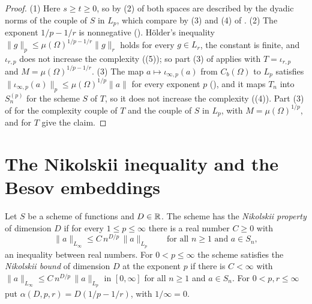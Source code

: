\begin{proof}
\leanok
{}
(1) Here $s \geq t \geq 0$, so by (2) of  both spaces are described by
the dyadic norms of the couple of $S$ in $L_p$, which compare by (3) and (4) of
. (2) The exponent $1/p - 1/r$ is nonnegative
(). H\"older's inequality
$\|g\|_p \leq \mu(\Omega)^{1/p - 1/r} \|g\|_r$ holds for every $g \in L_r$, the constant is
finite, and $\iota_{r,p}$ does not increase the complexity ((5)); so
part (3) of  applies with $T = \iota_{r,p}$ and
$M = \mu(\Omega)^{1/p - 1/r}$. (3) The map $a \mapsto \iota_{\infty,p}(a)$ from $C_b(\Omega)$ to
$L_p$ satisfies $\|\iota_{\infty,p}(a)\|_p \leq \mu(\Omega)^{1/p} \|a\|$ for every exponent
$p$ (), and it maps $T_n$ into
$S^{(p)}_n$ for the scheme $S$ of $T$, so it does not increase the complexity
((4)). Part (3) of  for the complexity
couple of $T$ and the couple of $S$ in $L_p$, with $M = \mu(\Omega)^{1/p}$, and
 for $T$ give the claim.
\end{proof}

\section{The Nikolskii inequality and the Besov embeddings}

\begin{definition}
\label{def:nikolskii-property}
\leanok
{}
Let $S$ be a scheme of functions and $D \in \mathbb{R}$. The scheme has the \emph{Nikolskii property}
of dimension $D$ if for every $1 \leq p \leq \infty$ there is a real number $C \geq 0$ with
\[
  \|a\|_{L_\infty} \leq C \, n^{D/p} \, \|a\|_{L_p}
  \qquad \text{for all } n \geq 1 \text{ and } a \in S_n ,
\]
an inequality between real numbers. For $0 < p \leq \infty$ the scheme satisfies the
\emph{Nikolskii bound} of dimension $D$ at the exponent $p$ if there is $C < \infty$ with
$\|a\|_{L_\infty} \leq C \, n^{D/p} \, \|a\|_{L_p}$ in $[0, \infty]$ for all $n \geq 1$ and
$a \in S_n$. For $0 < p, r \leq \infty$ put $\alpha(D, p, r) = D(1/p - 1/r)$, with
$1/\infty = 0$.
\end{definition}

